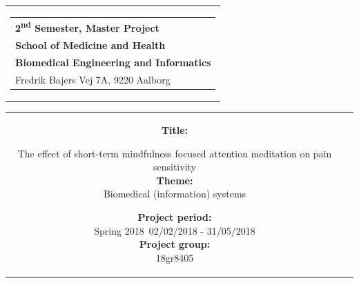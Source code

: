 % 
\thispagestyle{empty}
\begin{titlepage}
\begin{nopagebreak}
{\samepage 

\begin{tabular}{r}
\parbox{\textwidth}{  
\hfill \hspace{2cm} \parbox{8cm}{\begin{tabular}{l} %
{\small \textbf{\textcolor{aaublue}{{2\textsuperscript{nd} Semester, Master Project}}}}\\
{\small \textbf{\textcolor{aaublue}{School of Medicine and Health}}}\\
{\small \textbf{\textcolor{aaublue}{Biomedical Engineering and Informatics}}}\\
{\small \textcolor{aaublue}{Fredrik Bajers Vej 7A, 9220 Aalborg}} \\
\end{tabular}}}
\end{tabular}

\begin{tabular}{cc}
\parbox{7cm}{

\textbf{Title:} 

The effect of short-term mindfulness focused attention meditation on pain sensitivity  \\ 

\textbf{Theme:} \\
\small{
 Biomedical (information) systems\\
}


\parbox{8cm}{


\textbf{Project period:}\\
Spring 2018\
02/02/2018 - 31/05/2018\\
   
\textbf{Project group: }\\
18gr8405 \\
  
}}
\end{tabular}}
\end{nopagebreak}
\end{titlepage}
